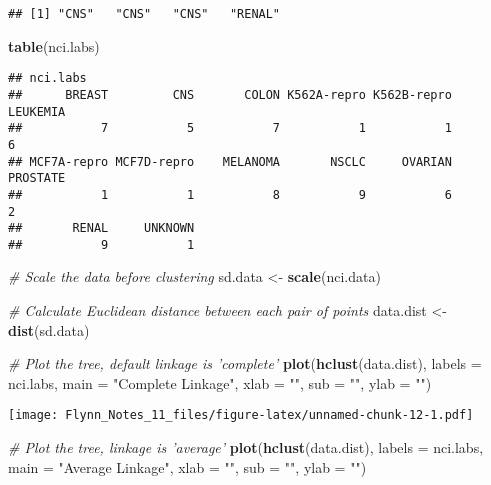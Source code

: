 \documentclass[]{article}
\newenvironment{Shaded}{\begin{snugshade}}{\end{snugshade}}
\newcommand{\KeywordTok}[1]{\textcolor[rgb]{0.13,0.29,0.53}{\textbf{#1}}}
\newcommand{\DataTypeTok}[1]{\textcolor[rgb]{0.13,0.29,0.53}{#1}}
\newcommand{\StringTok}[1]{\textcolor[rgb]{0.31,0.60,0.02}{#1}}
\newcommand{\CommentTok}[1]{\textcolor[rgb]{0.56,0.35,0.01}{\textit{#1}}}
\newcommand{\NormalTok}[1]{#1}
\begin{document}
\begin{verbatim}
## [1] "CNS"   "CNS"   "CNS"   "RENAL"
\end{verbatim}

\begin{Shaded}
\begin{Highlighting}[]
\KeywordTok{table}\NormalTok{(nci.labs)}
\end{Highlighting}
\end{Shaded}

\begin{verbatim}
## nci.labs
##      BREAST         CNS       COLON K562A-repro K562B-repro    LEUKEMIA 
##           7           5           7           1           1           6 
## MCF7A-repro MCF7D-repro    MELANOMA       NSCLC     OVARIAN    PROSTATE 
##           1           1           8           9           6           2 
##       RENAL     UNKNOWN 
##           9           1
\end{verbatim}

\begin{Shaded}
\begin{Highlighting}[]
\CommentTok{# Scale the data before clustering}
\NormalTok{sd.data <-}\StringTok{ }\KeywordTok{scale}\NormalTok{(nci.data)}

\CommentTok{# Calculate Euclidean distance between each pair of points}
\NormalTok{data.dist <-}\StringTok{ }\KeywordTok{dist}\NormalTok{(sd.data)}

\CommentTok{# Plot the tree, default linkage is 'complete'}
\KeywordTok{plot}\NormalTok{(}\KeywordTok{hclust}\NormalTok{(data.dist), }\DataTypeTok{labels =}\NormalTok{ nci.labs, }\DataTypeTok{main =} \StringTok{"Complete Linkage"}\NormalTok{, }\DataTypeTok{xlab =} \StringTok{""}\NormalTok{,}
     \DataTypeTok{sub =} \StringTok{""}\NormalTok{, }\DataTypeTok{ylab =} \StringTok{""}\NormalTok{)}
\end{Highlighting}
\end{Shaded}

\texttt{[image: Flynn\_Notes\_11\_files/figure-latex/unnamed-chunk-12-1.pdf]}

\begin{Shaded}
\begin{Highlighting}[]
\CommentTok{# Plot the tree, linkage is 'average'}
\KeywordTok{plot}\NormalTok{(}\KeywordTok{hclust}\NormalTok{(data.dist), }\DataTypeTok{labels =}\NormalTok{ nci.labs, }\DataTypeTok{main =} \StringTok{"Average Linkage"}\NormalTok{, }\DataTypeTok{xlab =} \StringTok{""}\NormalTok{, }
     \DataTypeTok{sub =} \StringTok{""}\NormalTok{, }\DataTypeTok{ylab =} \StringTok{""}\NormalTok{)}
\end{Highlighting}
\end{Shaded}
\end{document}
